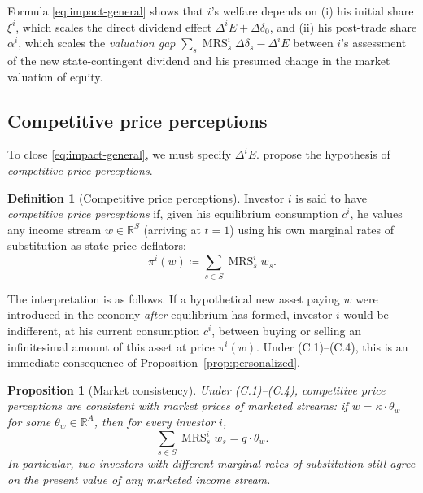 \documentclass[11pt,a4paper,oneside]{book}
\def\R{\mathbb{R}}
\DeclareMathOperator{\MRS}{MRS}
\theoremstyle{plain}
\newtheorem{proposition}[theorem]{Proposition}
\theoremstyle{definition}
\newtheorem{definition}[theorem]{Definition}
\theoremstyle{remark}
\numberwithin{equation}{chapter}
\begin{document}
Formula \eqref{eq:impact-general} shows that $i$'s welfare depends on (i) his initial share $\xi^i$, which scales the direct dividend effect $\Delta^i E + \Delta \delta_0$, and (ii) his post-trade share $\alpha^i$, which scales the \emph{valuation gap} $\sum_s \MRS^i_s \Delta \delta_s - \Delta^i E$ between $i$'s assessment of the new state-contingent dividend and his presumed change in the market valuation of equity.

\subsection{Competitive price perceptions}

To close \eqref{eq:impact-general}, we must specify $\Delta^i E$.
\citet{GrossmanHart1979} propose the hypothesis of \emph{competitive price perceptions}.

\begin{definition}[Competitive price perceptions]\label{def:cpp}
Investor $i$ is said to have \emph{competitive price perceptions} if, given his equilibrium consumption $c^i$, he values any income stream $w \in \R^S$ (arriving at $t=1$) using his own marginal rates of substitution as state-price deflators:
\begin{equation}\label{eq:cpp}
  \pi^i(w) \coloneqq \sum_{s \in S} \MRS^i_s w_s.
\end{equation}
\end{definition}

The interpretation is as follows.
If a hypothetical new asset paying $w$ were introduced in the economy \emph{after} equilibrium has formed, investor $i$ would be indifferent, at his current consumption $c^i$, between buying or selling an infinitesimal amount of this asset at price $\pi^i(w)$.
Under (C.1)--(C.4), this is an immediate consequence of Proposition~\ref{prop:personalized}.

\begin{proposition}[Market consistency]\label{prop:market-consistency}
Under \textup{(C.1)--(C.4)}, competitive price perceptions are consistent with market prices of \emph{marketed} streams: if $w = \kappa \cdot \theta_w$ for some $\theta_w \in \R^A$, then for every investor $i$,
\begin{equation}\label{eq:market-consistency}
  \sum_{s \in S} \MRS^i_s w_s = q \cdot \theta_w.
\end{equation}
In particular, two investors with different marginal rates of substitution still agree on the present value of any marketed income stream.
\end{proposition}
\end{document}
